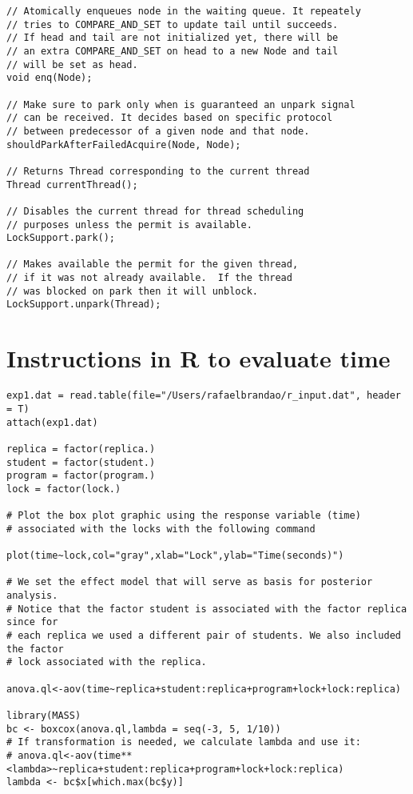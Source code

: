 \begin{appendices}
\begin{verbatim}
// Atomically enqueues node in the waiting queue. It repeately
// tries to COMPARE_AND_SET to update tail until succeeds.
// If head and tail are not initialized yet, there will be
// an extra COMPARE_AND_SET on head to a new Node and tail
// will be set as head.
void enq(Node);

// Make sure to park only when is guaranteed an unpark signal
// can be received. It decides based on specific protocol
// between predecessor of a given node and that node.
shouldParkAfterFailedAcquire(Node, Node);

// Returns Thread corresponding to the current thread
Thread currentThread();

// Disables the current thread for thread scheduling
// purposes unless the permit is available.
LockSupport.park();

// Makes available the permit for the given thread,
// if it was not already available.  If the thread
// was blocked on park then it will unblock.
LockSupport.unpark(Thread);
\end{verbatim}


\chapter{Instructions in R to evaluate time}
\noindent
\begin{verbatim}
exp1.dat = read.table(file="/Users/rafaelbrandao/r_input.dat", header = T)
attach(exp1.dat)

replica = factor(replica.)
student = factor(student.)
program = factor(program.)
lock = factor(lock.)

# Plot the box plot graphic using the response variable (time)
# associated with the locks with the following command

plot(time~lock,col="gray",xlab="Lock",ylab="Time(seconds)")

# We set the effect model that will serve as basis for posterior analysis.
# Notice that the factor student is associated with the factor replica since for
# each replica we used a different pair of students. We also included the factor
# lock associated with the replica.

anova.ql<-aov(time~replica+student:replica+program+lock+lock:replica)

library(MASS)
bc <- boxcox(anova.ql,lambda = seq(-3, 5, 1/10))
# If transformation is needed, we calculate lambda and use it:
# anova.ql<-aov(time**<lambda>~replica+student:replica+program+lock+lock:replica)
lambda <- bc$x[which.max(bc$y)]


\end{verbatim}
\end{appendices}
